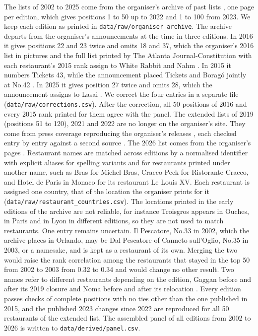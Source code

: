 \documentclass[11pt,a4paper]{article}
\begin{document}
The lists of 2002 to 2025 come from the organiser's archive of past lists \citep{the50archive}, one page per edition, which gives positions 1 to 50 up to 2022 and 1 to 100 from 2023. We keep each edition as printed in \texttt{data/raw/organiser\_archive}. The archive departs from the organiser's announcements at the time in three editions. In 2016 it gives positions 22 and 23 twice and omits 18 and 37, which the organiser's 2016 list in pictures and the full list printed by The Atlanta Journal-Constitution with each restaurant's 2015 rank assign to White Rabbit and Nahm \citep{w50b2016pictures,ajc2016}. In 2015 it numbers Tickets 43, while the announcement placed Tickets and Borag\'o jointly at No.42 \citep{w50b2015pictures}. In 2025 it gives position 27 twice and omits 28, which the announcement assigns to Lasai \citep{w50b2025lists}. We correct the four entries in a separate file (\texttt{data/raw/corrections.csv}). After the correction, all 50 positions of 2016 and every 2015 rank printed for them agree with the panel. The extended lists of 2019 (positions 51 to 120), 2021 and 2022 are no longer on the organiser's site. They come from press coverage reproducing the organiser's releases \citep{inkl2019,upcoming2021,upcoming2022}, each checked entry by entry against a second source \citep{hotdinners2019,hotdinners2021,hotdinners2022}. The 2026 list comes from the organiser's pages \citep{the50list2026}. Restaurant names are matched across editions by a normalised identifier with explicit aliases for spelling variants and for restaurants printed under another name, such as Bras for Michel Bras, Cracco Peck for Ristorante Cracco, and Hotel de Paris in Monaco for its restaurant Le Louis XV. Each restaurant is assigned one country, that of the location the organiser prints for it (\texttt{data/raw/restaurant\_countries.csv}). The locations printed in the early editions of the archive are not reliable, for instance Troisgros appears in Ouches, in Paris and in Lyon in different editions, so they are not used to match restaurants. One entry remains uncertain. Il Pescatore, No.33 in 2002, which the archive places in Orlando, may be Dal Pescatore of Canneto sull'Oglio, No.35 in 2003, or a namesake, and is kept as a restaurant of its own. Merging the two would raise the rank correlation among the restaurants that stayed in the top 50 from 2002 to 2003 from 0.32 to 0.34 and would change no other result. Two names refer to different restaurants depending on the edition, Gaggan before and after its 2019 closure and Noma before and after its relocation \citep{sansom2021noma}. Every edition passes checks of complete positions with no ties other than the one published in 2015, and the published 2023 changes since 2022 \citep{upcoming2023} are reproduced for all 50 restaurants of the extended list. The assembled panel of all editions from 2002 to 2026 is written to \texttt{data/derived/panel.csv}.
\end{document}
